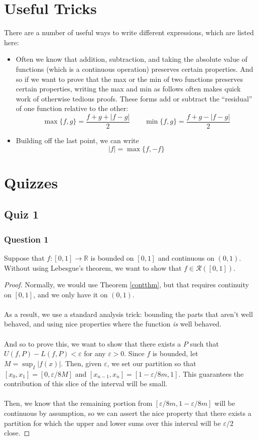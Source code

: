 \documentclass[12pt]{article}
\theoremstyle{plain}
\theoremstyle{definition}
\theoremstyle{remark}
\begin{document}
\newpage
\section{Useful Tricks}

There are a number of useful ways to write different expressions, which are listed here:
\begin{itemize}
\item Often we know that addition, subtraction, and taking the absolute value of functions (which is a continuous operation) preserves certain properties. And so if we want to prove that the max or the min of two functions preserves certain properties, writing the max and min as follows often makes quick work of otherwise tedious proofs. These forms add or subtract the ``residual'' of one function relative to the other: 
\[
    \max \{f,g\} = \frac{f+g+|f-g|}{2}\qquad 
    \min\{f,g\} = \frac{f+g-|f-g|}{2}
\]

\item Building off the last point, we can write 
    \[ 
        |f|=\max\{f,-f\}
    \]
\end{itemize}

\newpage
\section{Quizzes}

\subsection{Quiz 1}

\subsubsection{Question 1}

Suppose that $f: [0,1]\rightarrow \mathbb{R}$ is bounded on $[0,1]$ and continuous on $(0,1)$. Without using Lebesgue's theorem, we want to show that $f\in\mathscr{R}([0,1])$.
\begin{proof}
Normally, we would use Theorem \ref{contthm}, but that requires continuity on $[0,1]$, and we only have it on $(0,1)$.
\\
\\
As a result, we use a standard analysis trick: bounding the parts that aren't well behaved, and using nice properties where the function \emph{is} well behaved.
\\
\\
And so to prove this, we want to show that there exists a $P$ such that $U(f,P)-L(f,P)<\varepsilon$ for any $\varepsilon>0$. Since $f$ is bounded, let $M = \sup_I |f(x)|$. Then, given $\varepsilon$, we set our partition so that $[x_0, x_1] = [0, \varepsilon/8M]$ and $[x_{n-1}, x_n] = [1-\varepsilon/8m, 1]$. This guarantees the contribution of this slice of the interval will be small.
\\
\\
Then, we know that the remaining portion from $[\varepsilon/8m, 1-\varepsilon/8m]$ will be continuous by assumption, so we can assert the nice property that there exists a partition for which the upper and lower sums over this interval will be $\varepsilon/2$ close.
\end{proof}
\end{document}

